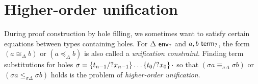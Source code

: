 \documentclass[twoside]{report}
\begin{document}




\section{Higher-order unification}
\label{sec:higher_order_unification}

During proof construction by hole filling, we sometimes want to satisfy certain equations between types containing holes. For $\Delta \envh$ and $a, b \termh$, the form $(a \cong_\Delta b)$ or $(a \preceq_\Delta b)$ is also called a \emph{unification constraint}. Finding term substitutions for holes $\sigma = \subst {?x_{n-1}} {t_{n-1}} {\ldots \subst {?x_0} {t_0} \cdot}$ so that $(\sigma a \equiv_{\sigma \Delta} \sigma b)$ or $(\sigma a \leq_{\sigma \Delta} \sigma b)$ holds is the problem of \emph{higher-order unification}.
\end{document}
